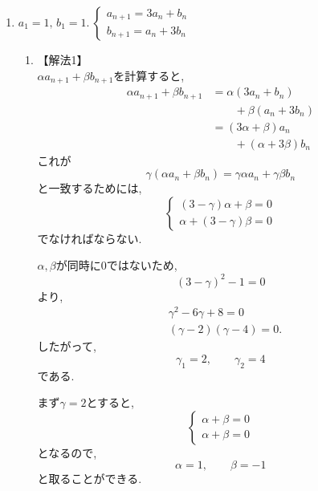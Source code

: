 \begin{enumerate}[label=(\arabic*),parsep=3pt]
  \item $\displaystyle a_1=1,\,b_1=1.\ \begin{cases}a_{n+1}=3a_n+b_n\\ b_{n+1}=a_n+3b_n\end{cases}$\\
        \begin{enumerate}
          \item 【解法1】\\
                $\alpha a_{n+1}+\beta b_{n+1}$を計算すると,
                \begin{align*}
                  \alpha a_{n+1}+\beta b_{n+1}
                   &=\alpha(3a_n+b_n)\\
                   &\qquad +\beta(a_n+3b_n)\\
                   &=(3\alpha+\beta)a_n\\
                   &\qquad +(\alpha+3\beta)b_n
                \end{align*}
                これが
                \[
                  \gamma(\alpha a_n+\beta b_n)
                  =\gamma\alpha a_n+\gamma\beta b_n
                \]
                と一致するためには,
                \[
                  \begin{cases}
                    (3-\gamma)\alpha+\beta=0 \\
                    \alpha+(3-\gamma)\beta=0
                  \end{cases}
                \]
                でなければならない.

                $\alpha,\beta$が同時に$0$ではないため,
                \[
                  (3-\gamma)^2-1=0
                \]
                より,
                \begin{align*}
                  &\gamma^2-6\gamma+8=0\\
                  &(\gamma-2)(\gamma-4)=0.
                \end{align*}
                したがって,
                \[
                  \gamma_1=2,\qquad\gamma_2=4
                \]
                である.

                まず$\gamma=2$とすると,
                \[
                  \begin{cases}
                    \alpha+\beta=0 \\
                    \alpha+\beta=0
                  \end{cases}
                \]
                となるので,
                \[
                  \alpha=1,\qquad\beta=-1
                \]
                と取ることができる.


\end{enumerate}
\end{enumerate}
